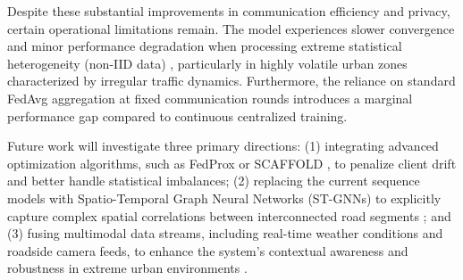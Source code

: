 \documentclass[pdflatex,sn-mathphys-num]{sn-jnl}
\theoremstyle{thmstyleone}
\theoremstyle{thmstyletwo}
\theoremstyle{thmstylethree}
\begin{document}
Despite these substantial improvements in communication efficiency and privacy, certain operational limitations remain. The model experiences slower convergence and minor performance degradation when processing extreme statistical heterogeneity (non-IID data) \cite{Zhao2018FederatedNonIID}, particularly in highly volatile urban zones characterized by irregular traffic dynamics. Furthermore, the reliance on standard FedAvg aggregation at fixed communication rounds introduces a marginal performance gap compared to continuous centralized training.

Future work will investigate three primary directions: (1) integrating advanced optimization algorithms, such as FedProx \cite{li2020fedprox} or SCAFFOLD \cite{karimireddy2020scaffold}, to penalize client drift and better handle statistical imbalances; (2) replacing the current sequence models with Spatio-Temporal Graph Neural Networks (ST-GNNs) \cite{chen2021tgcn,wu2019gwnet} to explicitly capture complex spatial correlations between interconnected road segments \cite{li2018dcrnn}; and (3) fusing multimodal data streams, including real-time weather conditions and roadside camera feeds, to enhance the system's contextual awareness and robustness in extreme urban environments \cite{zhang2017deep,yao2018deep}.

\backmatter

\clearpage
\nocite{*}

\end{document}
